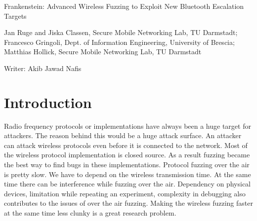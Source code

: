 \documentclass[letterpaper,11pt]{article}
\begin{document}
\begin{center}
{\Large Frankenstein: Advanced Wireless Fuzzing to Exploit New Bluetooth Escalation Targets} 

{Jan Ruge and Jiska Classen, Secure Mobile Networking Lab, TU Darmstadt;
Francesco Gringoli, Dept. of Information Engineering, University of Brescia;
Matthias Hollick, Secure Mobile Networking Lab, TU Darmstadt}
\bigskip

{\large Writer: Akib Jawad Nafis}
\date{\today}
\end{center}


%
%
%
%
%
%

\section{Introduction}

Radio frequency protocols or implementations have always been a huge target for attackers. The reason behind this would be a huge attack surface. An attacker can attack wireless protocols even before it is connected to the network. Most of the wireless protocol implementation is closed source. As a result fuzzing became the best way to find bugs in these implementations. Protocol fuzzing over the air is pretty slow. We have to depend on the wireless transmission time. At the same time there can be interference while fuzzing over the air. Dependency on physical devices, limitation while repeating an experiment, complexity in debugging also contributes to the issues of over the air fuzzing. Making the wireless fuzzing faster at the same time less clunky is a great research problem. 
\end{document}
